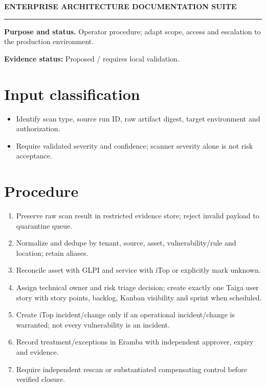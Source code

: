 \documentclass[10pt,letterpaper]{article}
\begin{document}
\begin{center}
{\large\bfseries\color{teal} ENTERPRISE ARCHITECTURE DOCUMENTATION SUITE}\par
{}\par
{}\par
\end{center}
\vspace{8pt}\hrule\vspace{12pt}
\textbf{Purpose and status.} Operator procedure; adapt scope, access and escalation to the production environment.\par
\textbf{Evidence status:} Proposed / requires local validation.\par
\section{Input classification}
\begin{itemize}
\item Identify scan type, source run ID, raw artifact digest, target environment and authorization.
\item Require validated severity and confidence; scanner severity alone is not risk acceptance.
\end{itemize}
\section{Procedure}
\begin{enumerate}
\item Preserve raw scan result in restricted evidence store; reject invalid payload to quarantine queue.
\item Normalize and dedupe by tenant, source, asset, vulnerability/rule and location; retain aliases.
\item Reconcile asset with GLPI and service with iTop or explicitly mark unknown.
\item Assign technical owner and risk triage decision; create exactly one Taiga user story with story points, backlog, Kanban visibility and sprint when scheduled.
\item Create iTop incident/change only if an operational incident/change is warranted; not every vulnerability is an incident.
\item Record treatment/exceptions in Eramba with independent approver, expiry and evidence.
\item Require independent rescan or substantiated compensating control before verified closure.
\end{enumerate}
\end{document}
